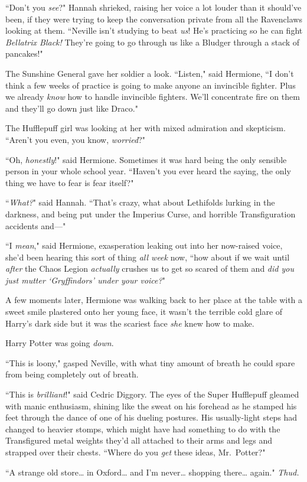 ``Don't you \emph{see}?" Hannah shrieked, raising her voice a lot louder than it should've been, if they were trying to keep the conversation private from all the Ravenclaws looking at them. ``Neville isn't studying to beat \emph{us}! He's practicing so he can fight \emph{Bellatrix Black!} They're going to go through us like a Bludger through a stack of pancakes!"

The Sunshine General gave her soldier a look. ``Listen," said Hermione, ``I don't think a few weeks of practice is going to make anyone an invincible fighter. Plus we already \emph{know} how to handle invincible fighters. We'll concentrate fire on them and they'll go down just like Draco."

The Hufflepuff girl was looking at her with mixed admiration and skepticism. ``Aren't you even, you know, \emph{worried}?"

``Oh, \emph{honestly}!" said Hermione. Sometimes it was hard being the only sensible person in your whole school year. ``Haven't you ever heard the saying, the only thing we have to fear is fear itself?"

``\emph{What?}" said Hannah. ``That's crazy, what about Lethifolds lurking in the darkness, and being put under the Imperius Curse, and horrible Transfiguration accidents and---"

``I \emph{mean}," said Hermione, exasperation leaking out into her now-raised voice, she'd been hearing this sort of thing \emph{all week} now, ``how about if we wait until \emph{after} the Chaos Legion \emph{actually} crushes us to get so scared of them and \emph{did you just mutter `Gryffindors' under your voice?}"

A few moments later, Hermione was walking back to her place at the table with a sweet smile plastered onto her young face, it wasn't the terrible cold glare of Harry's dark side but it was the scariest face \emph{she} knew how to make.

Harry Potter was going \emph{down}.

\later

``This is loony," gasped Neville, with what tiny amount of breath he could spare from being completely out of breath.

``This is \emph{brilliant}!" said Cedric Diggory. The eyes of the Super Hufflepuff gleamed with manic enthusiasm, shining like the sweat on his forehead as he stamped his feet through the dance of one of his dueling postures. His usually-light steps had changed to heavier stomps, which might have had something to do with the Transfigured metal weights they'd all attached to their arms and legs and strapped over their chests. ``Where do you \emph{get} these ideas, Mr.~Potter?"

``A strange old store{\ldots} in Oxford{\ldots} and I'm never{\ldots} shopping there{\ldots} again." \emph{Thud.}

